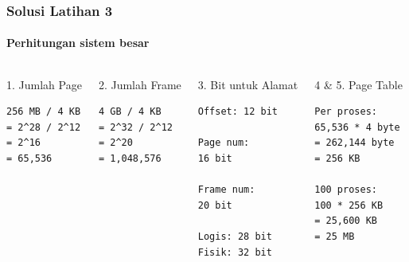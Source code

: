 \documentclass[t,aspectratio=169,xcolor=dvipsnames]{beamer}
\begin{document}
\begin{frame}[fragile]
    \frametitle{Solusi Latihan 3}
    \framesubtitle{Perhitungan sistem besar}
    \tiny

    \begin{columns}[T]
        \begin{block}{1. Jumlah Page}
            \begin{lstlisting}[basicstyle=\ttfamily\tiny,breaklines=true]
256 MB / 4 KB
= 2^28 / 2^12
= 2^16
= 65,536
            \end{lstlisting}
        \end{block}

        \begin{block}{2. Jumlah Frame}
            \begin{lstlisting}[basicstyle=\ttfamily\tiny,breaklines=true]
4 GB / 4 KB
= 2^32 / 2^12
= 2^20
= 1,048,576
            \end{lstlisting}
        \end{block}

        \begin{block}{3. Bit untuk Alamat}
            \begin{lstlisting}[basicstyle=\ttfamily\tiny,breaklines=true]
Offset: 12 bit

Page num:
16 bit

Frame num:
20 bit

Logis: 28 bit
Fisik: 32 bit
            \end{lstlisting}
        \end{block}

        \begin{block}{4 \& 5. Page Table}
            \begin{lstlisting}[basicstyle=\ttfamily\tiny,breaklines=true]
Per proses:
65,536 * 4 byte
= 262,144 byte
= 256 KB

100 proses:
100 * 256 KB
= 25,600 KB
= 25 MB
            \end{lstlisting}
        \end{block}
    \end{columns}
\end{frame}
\end{document}
